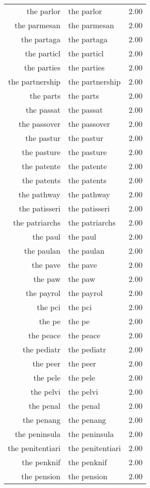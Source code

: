 \begin{table}[ht]
\begin{tabular}{rlr}
  the parlor & the parlor & 2.00 \\ 
  the parmesan & the parmesan & 2.00 \\ 
  the partaga & the partaga & 2.00 \\ 
  the particl & the particl & 2.00 \\ 
  the parties & the parties & 2.00 \\ 
  the partnership & the partnership & 2.00 \\ 
  the parts & the parts & 2.00 \\ 
  the passat & the passat & 2.00 \\ 
  the passover & the passover & 2.00 \\ 
  the pastur & the pastur & 2.00 \\ 
  the pasture & the pasture & 2.00 \\ 
  the patente & the patente & 2.00 \\ 
  the patents & the patents & 2.00 \\ 
  the pathway & the pathway & 2.00 \\ 
  the patisseri & the patisseri & 2.00 \\ 
  the patriarchs & the patriarchs & 2.00 \\ 
  the paul & the paul & 2.00 \\ 
  the paulan & the paulan & 2.00 \\ 
  the pave & the pave & 2.00 \\ 
  the paw & the paw & 2.00 \\ 
  the payrol & the payrol & 2.00 \\ 
  the pci & the pci & 2.00 \\ 
  the pe & the pe & 2.00 \\ 
  the peace & the peace & 2.00 \\ 
  the pediatr & the pediatr & 2.00 \\ 
  the peer & the peer & 2.00 \\ 
  the pele & the pele & 2.00 \\ 
  the pelvi & the pelvi & 2.00 \\ 
  the penal & the penal & 2.00 \\ 
  the penang & the penang & 2.00 \\ 
  the peninsula & the peninsula & 2.00 \\ 
  the penitentiari & the penitentiari & 2.00 \\ 
  the penknif & the penknif & 2.00 \\ 
  the pension & the pension & 2.00 \\ 

\end{tabular}
\end{table}
